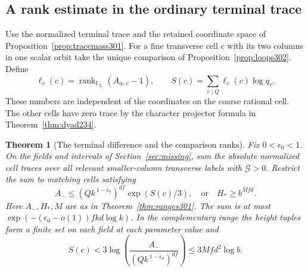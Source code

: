 \documentclass[a4paper,11pt]{article}
\newtheorem{theorem}[proposition]{Theorem}
\theoremstyle{definition}
\theoremstyle{remark}
\numberwithin{equation}{section}
\begin{document}
\subsection{A rank estimate in the ordinary terminal trace}\label{nav:VII-60}
Use the normalized terminal trace and the retained coordinate
space of Proposition~\ref{prop:tracemass301}. For a fine
transverse cell \(c\) with its two columns in one scalar orbit
take the unique comparison of Proposition~\ref{prop:loops302}.
Define
\[
 \ell_v(c)=\operatorname{rank}_{\mathbb F_{q_v}}
                      (A_{\alpha,v}-1),\qquad
 S(c)=\sum_{v\mid Q}\ell_v(c)\log q_v .
\]
These numbers are independent of the coordinates on the
coarse rational cell. The other cells have zero trace by the
character projector formula in Theorem~\ref{thm:dyad234}.

\begin{theorem}[The terminal difference and the comparison ranks]\leavevmode
\label{thm:ranktrace302}
Fix \(0<\epsilon_0<1\). On the fields and intervals of
Section~\ref{sec:missing}, sum the absolute normalized cell traces over
all relevant smaller-column transverse labels with
\(\mathcal G>0\). Restrict the sum to matching cells satisfying
\[
    A_-\le (Q k^{\,1-\epsilon_0})^{df}\exp(S(c)/3),
       \quad\text{or}\quad H_*\ge b^{Mfd}.
\]
Here \(A_-,H_*,M\) are as in Theorem~\ref{thm:ranges301}.
The sum is at most \(\exp(-(\epsilon_0-o(1))fkd\log k)\).
In the complementary range the height tuples form a finite
set on each field at each parameter value and
\[
 S(c)< 3\log\!\left(\frac{A_-}{(Qk^{\,1-\epsilon_0})^{df}}\right)
        \le 3Mfd^2\log b .
\]
\end{theorem}
\end{document}
